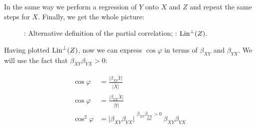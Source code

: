 In the same way we perform a regression of $Y$ onto $X$ and $Z$ and repeat the
same steps for $X$. Finally, we get the whole picture:

\begin{figure}[ht!]
\begin{center}
\caption{: Alternative definition of the partial correlation;
: $\operatorname{Lin}^{\perp}(Z)$.}
\end{center}
\end{figure}

Having plotted $\operatorname{Lin}^{\perp}(Z)$, now we can express $\cos \varphi$ in terms of $\beta_{XY}$
and $\beta_{YX}$. We will use the fact that $\beta_{XY} \beta_{YX} > 0$:

\begin{equation*}%
\begin{split}
\cos \varphi &= \frac{\vert \beta_{XY} \widetilde Y \vert}{\vert \widetilde X \vert} \\
\cos \varphi &= \frac{\vert \beta_{YX} \widetilde X \vert}{\vert \widetilde Y \vert} \\
\cos^2 \varphi &= \vert \beta_{XY} \beta_{YX} \vert \stackrel{\beta_{XY} \beta_{YX} > 0}{=} \beta_{XY} \beta_{YX}
\end{split}
\end{equation*}

